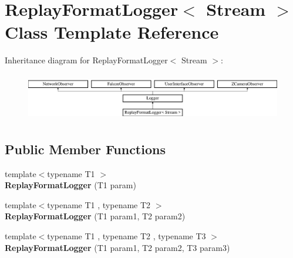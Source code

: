 \hypertarget{classReplayFormatLogger}{
\section{ReplayFormatLogger$<$ Stream $>$ Class Template Reference}
\label{classReplayFormatLogger}
}
Inheritance diagram for ReplayFormatLogger$<$ Stream $>$:\begin{figure}[H]
\begin{center}
\leavevmode
\includegraphics[height=2.089552cm]{classReplayFormatLogger}
\end{center}
\end{figure}
\subsection*{Public Member Functions}
\begin{DoxyCompactItemize}
\item 
\hypertarget{classReplayFormatLogger_a63a0043e0c400decedb7403780901159}{
{\footnotesize template$<$typename T1 $>$ }\\{\bfseries ReplayFormatLogger} (T1 param)}
\label{classReplayFormatLogger_a63a0043e0c400decedb7403780901159}

\item 
\hypertarget{classReplayFormatLogger_a2a048b2c87b25c64ed95fa9c6904ff61}{
{\footnotesize template$<$typename T1 , typename T2 $>$ }\\{\bfseries ReplayFormatLogger} (T1 param1, T2 param2)}
\label{classReplayFormatLogger_a2a048b2c87b25c64ed95fa9c6904ff61}

\item 
\hypertarget{classReplayFormatLogger_a767584e0a4ada86bf9012bd3279a77ac}{
{\footnotesize template$<$typename T1 , typename T2 , typename T3 $>$ }\\{\bfseries ReplayFormatLogger} (T1 param1, T2 param2, T3 param3)}
\label{classReplayFormatLogger_a767584e0a4ada86bf9012bd3279a77ac}

\end{DoxyCompactItemize}
